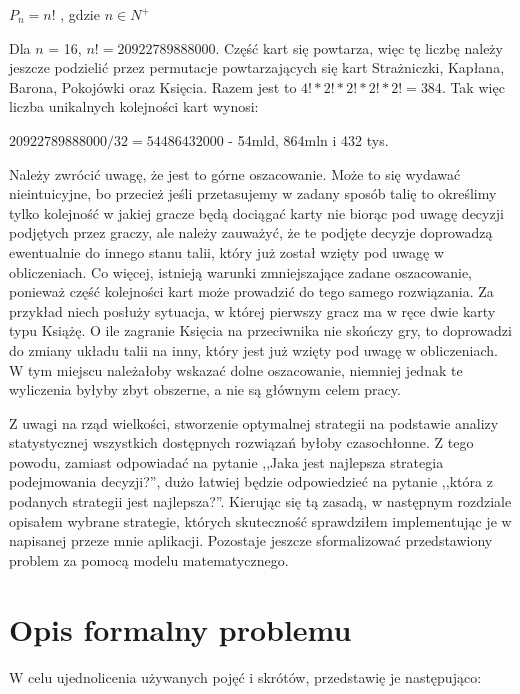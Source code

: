 \begin{center}
	$P_n = n!$ , gdzie $n\in N^+$
\end{center}

Dla  $n$ = 16, $n!=20 922 789 888 000$. Część kart się powtarza, więc tę liczbę należy jeszcze podzielić przez permutacje powtarzających się kart Strażniczki, Kapłana, Barona, Pokojówki oraz Księcia. Razem jest to $4! * 2! * 2! * 2! * 2! =  384$. Tak więc liczba unikalnych kolejności kart wynosi: 

\begin{center}
	$20 922 789 888 000 / 32 = 54486432000$ - 54mld, 864mln i 432 tys.
\end{center}

Należy zwrócić uwagę, że jest to górne oszacowanie. Może to się wydawać nieintuicyjne, bo przecież jeśli przetasujemy w zadany sposób talię to określimy tylko kolejność w jakiej gracze będą dociągać karty nie biorąc pod uwagę decyzji podjętych przez graczy, ale należy zauważyć, że te podjęte decyzje doprowadzą ewentualnie do innego stanu talii, który już został wzięty pod uwagę w obliczeniach. Co więcej, istnieją warunki zmniejszające zadane oszacowanie, ponieważ część kolejności kart może prowadzić do tego samego rozwiązania. Za przykład niech posłuży sytuacja, w której pierwszy gracz ma w ręce dwie karty typu Książę. O ile zagranie Księcia na przeciwnika nie skończy gry, to doprowadzi do zmiany układu talii na inny, który jest już wzięty pod uwagę w obliczeniach. W tym miejscu należałoby wskazać dolne oszacowanie, niemniej jednak te wyliczenia byłyby zbyt obszerne, a nie są głównym celem pracy.

Z uwagi na rząd wielkości, stworzenie optymalnej strategii na podstawie analizy statystycznej wszystkich dostępnych rozwiązań byłoby czasochłonne. Z tego powodu, zamiast odpowiadać na pytanie ,,Jaka jest najlepsza strategia podejmowania decyzji?'', dużo łatwiej będzie odpowiedzieć na pytanie ,,która z podanych strategii jest najlepsza?''. Kierując się tą zasadą, w następnym rozdziale opisałem wybrane strategie, których skuteczność sprawdziłem implementując je w napisanej przeze mnie aplikacji. Pozostaje jeszcze sformalizować przedstawiony problem za pomocą modelu matematycznego.


\section{Opis formalny problemu}
W celu ujednolicenia używanych pojęć i skrótów, przedstawię je następująco:

